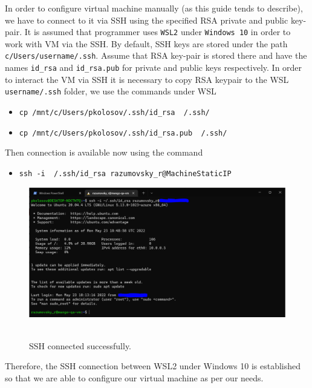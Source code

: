 In order to configure virtual machine manually (as this guide tends to describe),
we have to connect to it via SSH using the specified RSA private and public key-pair.
It is assumed that programmer uses \texttt{WSL2} under \texttt{Windows 10} in order to work with VM via the SSH\@.
By default, SSH keys are stored under the path \texttt{c/Users/username/.ssh}.
Assume that RSA key-pair is stored there and have the names \texttt{id\_rsa} and \texttt{id\_rsa.pub} for private
and public keys respectively.
In order to interact the VM via SSH it is necessary to copy RSA keypair to the WSL \texttt{username/.ssh} folder,
we use the commands under WSL
\begin{itemize}
    \item \texttt{cp /mnt/c/Users/pkolosov/.ssh/id\_rsa ~/.ssh/}
    \item \texttt{cp /mnt/c/Users/pkolosov/.ssh/id\_rsa.pub ~/.ssh/}
\end{itemize}
Then connection is available now using the command
\begin{itemize}
    \item \texttt{ssh -i ~/.ssh/id\_rsa razumovsky\_r@MachineStaticIP}
\end{itemize}
\begin{figure}[H]
    \centering
    \includegraphics[width=1\textwidth]{img/01_ssh_connected}
    ~\caption{SSH connected successfully.}\label{fig:figure}
\end{figure}
Therefore, the SSH connection between WSL2 under Windows 10 is established so that we are able to configure our virtual
machine as per our needs.